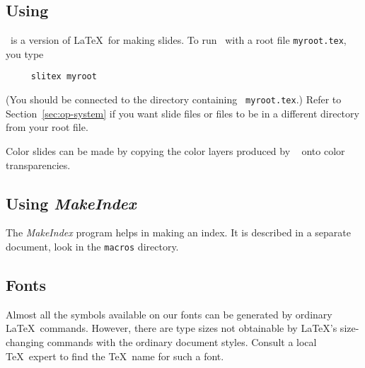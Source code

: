 
\subsection{Using \SLiTeX}

\SLiTeX\ is a version of \LaTeX\ for making slides.
To run \SLiTeX\  with a root file \mbox{\tt myroot.tex}, you type
\begin{verbatim}
     slitex myroot
\end{verbatim}
(You should be connected to the directory containing \mbox{\tt
myroot.tex}.) Refer to Section~\ref{sec:op-system} if you want slide
files or \hbox{\verb||} files to be in a different directory from
your root file.

Color slides can be made by copying the color layers produced by \SLiTeX\
%
onto color transparencies.

\subsection{Using {\em MakeIndex\/}} \label{sec:makeindex}

The {\em MakeIndex\/} program helps in making an index.  It is
described in a separate document, look in the {\tt macros} directory.


\subsection{Fonts}

Almost all the symbols available on our fonts can be generated by
ordinary \LaTeX\ commands.  However, there are type sizes not
obtainable by \LaTeX's size-changing commands with the ordinary
document styles.  Consult a local \TeX\ expert to find the
\TeX\ name for such a font.

